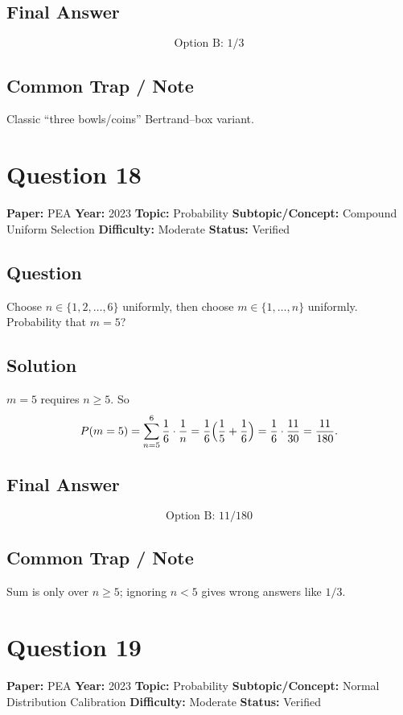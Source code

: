 \documentclass[11pt]{article}
\begin{document}
\subsection*{Final Answer}
\[
\boxed{\text{Option B: } 1/3}
\]

\subsection*{Common Trap / Note}
Classic ``three bowls/coins'' Bertrand--box variant.

\medskip

\section*{Question 18}
\textbf{Paper:} PEA \quad \textbf{Year:} 2023 \quad \textbf{Topic:} Probability \quad \textbf{Subtopic/Concept:} Compound Uniform Selection \quad \textbf{Difficulty:} Moderate \quad \textbf{Status:} Verified

\subsection*{Question}
Choose $n\in\{1,2,\dots,6\}$ uniformly, then choose $m\in\{1,\dots,n\}$ uniformly. Probability that $m=5$?

\subsection*{Solution}
$m=5$ requires $n\ge 5$. So
\[
P(m=5)=\sum_{n=5}^{6}\frac{1}{6}\cdot\frac{1}{n}=\frac{1}{6}\Bigl(\frac{1}{5}+\frac{1}{6}\Bigr)=\frac{1}{6}\cdot\frac{11}{30}=\frac{11}{180}.
\]

\subsection*{Final Answer}
\[
\boxed{\text{Option B: } 11/180}
\]

\subsection*{Common Trap / Note}
Sum is only over $n\ge 5$; ignoring $n<5$ gives wrong answers like $1/3$.

\medskip

\section*{Question 19}
\textbf{Paper:} PEA \quad \textbf{Year:} 2023 \quad \textbf{Topic:} Probability \quad \textbf{Subtopic/Concept:} Normal Distribution Calibration \quad \textbf{Difficulty:} Moderate \quad \textbf{Status:} Verified
\end{document}
